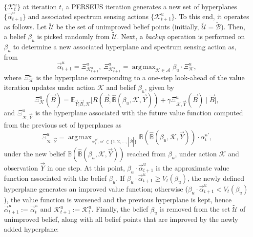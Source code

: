 \documentclass[10pt,twocolumn]{IEEEtran}
\DeclareMathOperator*{\argmax}{arg\,max}
\begin{document}
$\{\mathcal K_{t}^{u}\}$ at iteration $t$, a PERSEUS iteration generates a new set of hyperplanes $\{\vec{\alpha}_{t+1}^{u}\}$ and associated spectrum sensing actions
$\{\mathcal K_{t+1}^{u}\}$. To this end, it operates as follows. Let $\tilde{\mathcal{U}}$ be the set of unimproved belief points (initially, $\tilde{\mathcal{U}}{=}\tilde{\mathcal{B}}$). Then, a belief $\beta_u$ is picked randomly from $\tilde{\mathcal{U}}$. Next, a \emph{backup} operation is performed on $\beta_u$ to determine a new associated hyperplane and spectrum sensing action as, from \cite{DBLP:journals/corr/abs-1109-2145}
\begin{equation}\label{20}
    \vec{\alpha}_{t+1}^{u}=\Xi_{\mathcal K_{t+1}^{u}}^{u},\ \Xi_{\mathcal K_{t+1}^{u}}^{u}=\argmax_{\mathcal{K} \in \mathcal{A}} \beta_u \cdot \Xi_{\mathcal{K}}^{u},
\end{equation}
where $\Xi_{\mathcal{K}}^{u}$ is the hyperplane corresponding to a one-step look-ahead of the value iteration updates under action $\mathcal K$ and belief $\beta_u$, given by
\begin{equation}
        \Xi_{\mathcal{K}}^{u}(\vec{B}) = \mathbb{E}_{\vec{Y}|\vec{B}, \mathcal{K}} \Big[R(\vec{B}, \hat{\mathbb{B}}(\beta_{u}, \mathcal{K}, \vec{Y}))+\gamma 
        \Xi_{\mathcal{K}, \vec{Y}}^{u}(\vec{B})\mid\vec{B}\Big],
\nonumber
\end{equation}
and $\Xi_{\mathcal{K}, \vec{Y}}^{u}$ is the hyperplane associated with the future value function computed from the previous set of hyperplanes as
\begin{equation}
    \Xi_{\mathcal{K}, \vec{Y}}^{u}=\argmax_{\alpha_{t}^{u'}, u' {\in} \{1, 2, \dots, |\tilde{\mathcal{B}}|\}} \mathbb{B}(\hat{\mathbb{B}}(\beta_{u}, \mathcal{K}, \vec{Y}))\cdot\alpha_{t}^{u'},
\nonumber
\end{equation}
under the new belief $\mathbb{B}(\hat{\mathbb{B}}(\beta_{u}, \mathcal{K}, \vec{Y}))$ reached from $\beta_{u}$, under action $\mathcal{K}$ and observation $\vec{Y}$ in one step. At this point, $\beta_{u}{\cdot}\vec{\alpha}_{t+1}^{u}$ is the approximate value function associated with the belief $\beta_u$. If $\beta_{u}{\cdot}\vec{\alpha}_{t+1}^{u}{\geq}V_{t}(\beta_{u})$, the newly defined hyperplane generates an improved value function; otherwise ($\beta_{u}{\cdot}\vec{\alpha}_{t+1}^{u}{<}V_{t}(\beta_{u})$), the value function is worsened and the previous hyperplane is kept, hence $\vec{\alpha}_{t+1}^{u}{:=}\vec{\alpha}_{t}^{u}$ and $\mathcal K_{t+1}^{u}{:=}\mathcal K_{t}^{u}$. Finally, the belief $\beta_u$ is removed from the set $\tilde{\mathcal{U}}$ of unimproved belief, along with all belief points that are improved by the newly added hyperplane:
\end{document}
